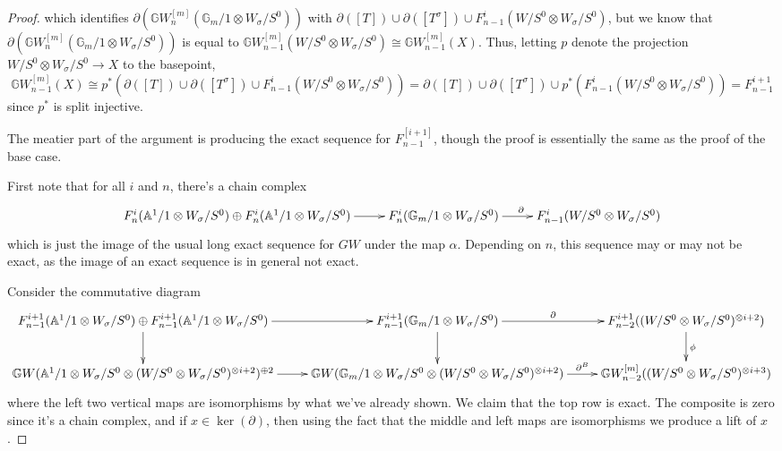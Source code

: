 \documentclass[draftthesis,tocnosub,noragright,centerchapter,10pt]{uiucthesis2009}
\newcommand{\mbb}{\mathbb}
\theoremstyle{plain}
\theoremstyle{definition}
\begin{document}
\begin{proof}
which identifies $\partial(\mbb GW^{[m]}_n(\mbb G_m/1
  \otimes W_\sigma/S^0))$ with $\partial([T]) \cup \partial([T^\sigma])
\cup  F^{i}_{n-1}(W/S^0 \otimes W_\sigma/S^0)$, but we know that
  $\partial(\mbb GW^{[m]}_n(\mbb G_m/1
  \otimes W_\sigma/S^0))$ is equal to $\mbb
GW^{[m]}_{n-1}(W/S^0 \otimes W_\sigma/S^0) \cong \mbb
GW^{[m]}_{n-1}(X)$. Thus, letting $p$ denote the projection $W/S^0
\otimes W_\sigma/S^0 \rightarrow X$ to the basepoint, 
\[
\mbb GW^{[m]}_{n-1}(X) \cong p^*(\partial([T]) \cup \partial([T^\sigma])
\cup  F^{i}_{n-1}(W/S^0 \otimes W_\sigma/S^0)) = \partial([T]) \cup \partial([T^\sigma])
\cup  p^*(F^{i}_{n-1}(W/S^0 \otimes W_\sigma/S^0))  = F^{i+1}_{n-1}
\]
since $p^*$ is split injective.

The meatier part of the argument is producing the exact sequence for
$F^{[i+1]}_{n-1}$, though the proof is essentially the same as the
proof of the base case. 

First note that for all $i$ and $n$, there's a chain complex
\[
\xymatrix{F^i_n(\mbb A^1/1 \otimes W_\sigma/S^0)  \oplus F^i_n(\mbb
  A^1/1 \otimes W_\sigma/S^0)  \ar[r] & F^i_n(\mbb G_m/1 \otimes W_\sigma/S^0) \ar[r]^{\partial} &
  F^{i}_{n-1}(W/S^0 \otimes W_\sigma/S^0) }
\]
which is just the image of the usual long exact sequence for $GW$
under the map $\alpha$. Depending on $n$, this sequence
may or may not be exact, as the image of an exact sequence is in
general not exact. 

Consider the commutative diagram
\small
\[
\xymatrix{F^{i+1}_{n-1}(\mbb A^1/1 \otimes W_\sigma/S^0)  \oplus F^{i+1}_{n-1}(\mbb
  A^1/1 \otimes W_\sigma/S^0)  \ar[r] \ar[d]& F^{i+1}_{n-1}(\mbb G_m/1
  \otimes W_\sigma/S^0) \ar[r]^-{\partial} \ar[d]& \ar[d]^{\phi}
  F^{i+1}_{n-2}((W/S^0 \otimes W_\sigma/S^0)^{\otimes i+2}) \\
\mbb GW(\mbb A^1/1 \otimes W_\sigma/S^0 \otimes (W/S^0 \otimes
W_\sigma/S^0)^{\otimes i+2})^{\oplus 2} \ar[r] & \mbb
GW(\mbb G_m/1 \otimes W_\sigma/S^0 \otimes (W/S^0 \otimes W_\sigma/S^0)^{\otimes i+2}) \ar[r]^-{\partial^B} &
 \mbb GW^{[m]}_{n-2}((W/S^0 \otimes W_\sigma/S^0)^{\otimes i+3}) }
\]
\normalsize
where the left two vertical maps are isomorphisms by what we've
already shown. We claim that the top row is exact. The composite is
zero since it's a chain complex, and if $x \in \ker(\partial)$, then
using the fact that the middle and left maps are isomorphisms we
produce a lift of $x$. 



\end{proof}
\end{document}
